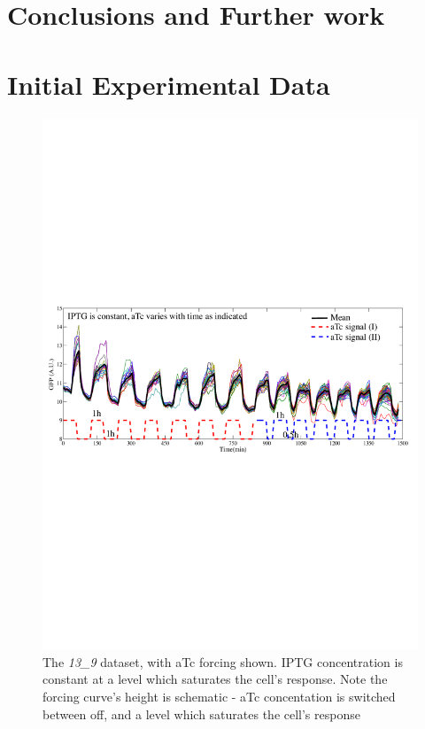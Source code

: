 \documentclass[10pt,journal]{./IEEE_latex_class/IEEEtran}
\begin{document}
\clearpage
 

\section{Conclusions and Further work}
\label{Conclusions and Further work}





\clearpage
\onecolumn

\appendices
\renewcommand\thefigure{\thesection.\arabic{figure}}  


\section{Initial Experimental Data}
\label{Initial Experimental Data}
\setcounter{figure}{0}    

\begin{figure}[h]
\centering
\includegraphics[trim = 0 310 0 300 , scale = 0.5, clip = true]{13_9}
\caption{The \textit{13\_9} dataset, with aTc forcing shown. IPTG concentration is constant at a level which saturates the cell's response. Note the forcing curve's height is schematic - aTc concentation is switched between off, and a level which saturates the cell's response}
\label{reactionscheme}
\end{figure}
\end{document}
